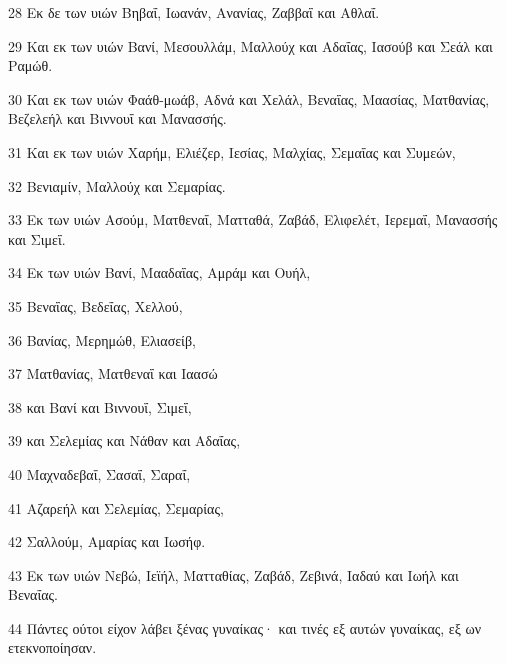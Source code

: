 \par 28 Εκ δε των υιών Βηβαΐ, Ιωανάν, Ανανίας, Ζαββαΐ και Αθλαΐ.
\par 29 Και εκ των υιών Βανί, Μεσουλλάμ, Μαλλούχ και Αδαΐας, Ιασούβ και Σεάλ και Ραμώθ.
\par 30 Και εκ των υιών Φαάθ-μωάβ, Αδνά και Χελάλ, Βεναΐας, Μαασίας, Ματθανίας, Βεζελεήλ και Βιννουΐ και Μανασσής.
\par 31 Και εκ των υιών Χαρήμ, Ελιέζερ, Ιεσίας, Μαλχίας, Σεμαΐας και Συμεών,
\par 32 Βενιαμίν, Μαλλούχ και Σεμαρίας.
\par 33 Εκ των υιών Ασούμ, Ματθεναΐ, Ματταθά, Ζαβάδ, Ελιφελέτ, Ιερεμαΐ, Μανασσής και Σιμεΐ.
\par 34 Εκ των υιών Βανί, Μααδαΐας, Αμράμ και Ουήλ,
\par 35 Βεναΐας, Βεδεΐας, Χελλού,
\par 36 Βανίας, Μερημώθ, Ελιασείβ,
\par 37 Ματθανίας, Ματθεναΐ και Ιαασώ
\par 38 και Βανί και Βιννουΐ, Σιμεΐ,
\par 39 και Σελεμίας και Νάθαν και Αδαΐας,
\par 40 Μαχναδεβαΐ, Σασαΐ, Σαραΐ,
\par 41 Αζαρεήλ και Σελεμίας, Σεμαρίας,
\par 42 Σαλλούμ, Αμαρίας και Ιωσήφ.
\par 43 Εκ των υιών Νεβώ, Ιεϊήλ, Ματταθίας, Ζαβάδ, Ζεβινά, Ιαδαύ και Ιωήλ και Βεναΐας.
\par 44 Πάντες ούτοι είχον λάβει ξένας γυναίκας· και τινές εξ αυτών γυναίκας, εξ ων ετεκνοποίησαν.



